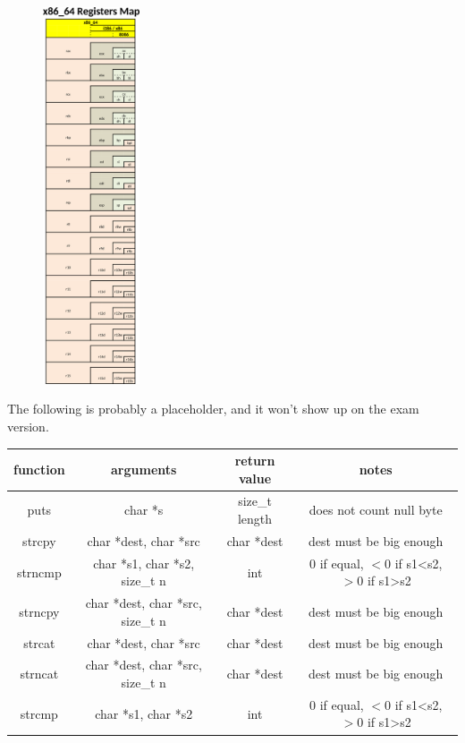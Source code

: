 \documentclass[letterpaper,12pt]{exam}
\begin{document}
\begin{minipage}[t]{0.3\textwidth}
\begin{figure}[H]
  \centering
    \includegraphics[width=2.87cm]{../../02_Registers/images/X86_64-GP-registersBIG.png}
\end{figure}
\end{minipage}
\newpage
\vspace{0.5in}
The following is probably a placeholder, and it won't show up on the exam version.\\
\begin{tabular}{|c|c|c|c|}
    \hline
   function & arguments & return value & notes\\    
    \hline
    puts & char *s & size\_t length & does not count null byte \\
    \hline
    strcpy & char *dest, char *src & char *dest & dest must be big enough \\
    \hline
    strncmp & char *s1, char *s2, size\_t n & int & 0 if equal, $<$0 if s1<s2, $>$0 if s1>s2 \\
    \hline
    strncpy & char *dest, char *src, size\_t n & char *dest & dest must be big enough \\
    \hline
    strcat & char *dest, char *src & char *dest & dest must be big enough \\
    \hline
    strncat & char *dest, char *src, size\_t n & char *dest & dest must be big enough \\
    \hline
    strcmp & char *s1, char *s2 & int & 0 if equal, $<$0 if s1<s2, $>$0 if s1>s2 \\
    \hline
\end{tabular}
   \twocolumn
\end{document}

